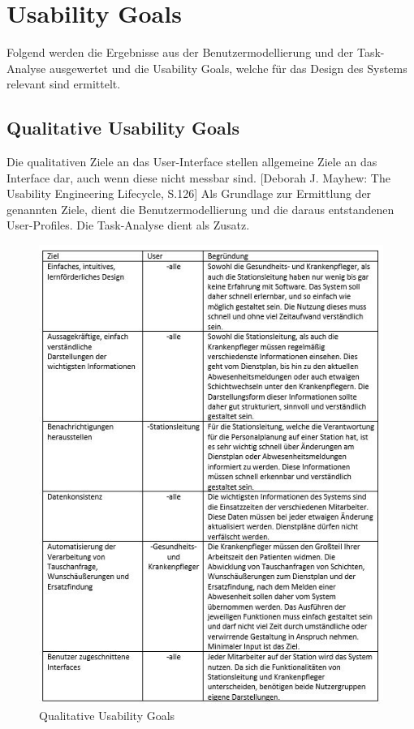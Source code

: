 \documentclass[11pt,
paper=a4,
bibtotocnumbered,	  %
liststotocnumbered,  %
DIV=calc,		  %
tablecaptionabove,	  %
headinclude,
]{article}
\begin{document}
\section{Usability Goals}
Folgend werden die Ergebnisse aus der Benutzermodellierung und der Task-Analyse ausgewertet und die Usability Goals, welche für das Design des Systems relevant sind ermittelt. 
\subsection{Qualitative Usability Goals}
Die qualitativen Ziele an das User-Interface stellen allgemeine Ziele an das Interface dar, auch wenn diese nicht messbar sind. [Deborah J. Mayhew: The Usability Engineering Lifecycle, S.126] 
Als Grundlage zur Ermittlung der genannten Ziele, dient die Benutzermodellierung und die daraus entstandenen User-Profiles. Die Task-Analyse dient als Zusatz.
\begin{figure}
\includegraphics[scale=1]{Bilder/qualiUser.jpg}
\caption{Qualitative Usability Goals }
\end{figure}
\end{document}
